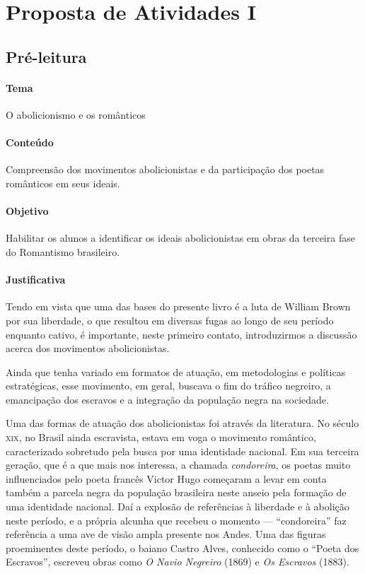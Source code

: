 \documentclass[12pt]{extarticle}
\begin{document}

\section{Proposta de Atividades I}

\subsection{Pré-leitura}

\paragraph{Tema} O abolicionismo e os românticos

\paragraph{Conteúdo} Compreensão dos movimentos abolicionistas e da
participação dos poetas românticos em seus ideais.

\paragraph{Objetivo} Habilitar os alunos a identificar os ideais
abolicionistas em obras da terceira fase do Romantismo brasileiro.

\paragraph{Justificativa} Tendo em vista que uma das bases do presente
livro é a luta de William Brown por sua liberdade, o que resultou em diversas
fugas ao longo de seu período enquanto cativo, é importante, neste primeiro
contato, introduzirmos a discussão acerca dos movimentos abolicionistas.

Ainda que tenha variado em formatos de atuação, em
metodologias e políticas estratégicas, esse movimento, em geral, buscava
o fim do tráfico negreiro, a emancipação dos escravos e a integração da
população negra na sociedade. 

Uma das formas de atuação dos abolicionistas foi através
da literatura. No século \textsc{xix}, no Brasil ainda escravista,
estava em voga o movimento romântico, caracterizado sobretudo pela busca 
por uma identidade nacional. Em sua terceira geração, que é a que mais nos
interessa, a chamada
\emph{condoreira}, os poetas muito influenciados pelo poeta francês Victor Hugo
começaram a levar em conta também a parcela negra da população brasileira
neste anseio pela formação de uma identidade nacional. Daí a explosão 
de referências à liberdade e à abolição neste período, e a própria
alcunha que recebeu o momento --- ``condoreira'' faz referência a 
uma ave de visão ampla presente nos Andes. Uma das figuras proeminentes 
deste período, o baiano Castro Alves, conhecido como o ``Poeta 
dos Escravos'', escreveu obras como \emph{O Navio Negreiro} (1869) e 
\emph{Os Escravos} (1883).
\end{document}

